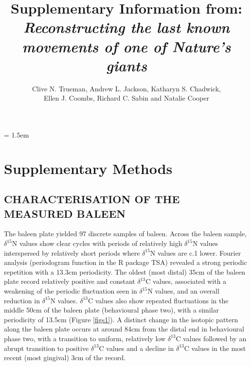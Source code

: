 \documentclass[a4paper,12pt]{article}
\title{Supplementary Information from:\\
\textit{Reconstructing the last known movements of one of Nature's giants}}
\author{Clive N. Trueman, Andrew L. Jackson, Katharyn S. Chadwick,\\ 
Ellen J. Coombs, Richard C. Sabin and Natalie Cooper}
\date{}
\begin{document}

\maketitle

\parindent = 1.5em
\addtolength{\parskip}{.3em}


\section*{Supplementary Methods}
 
\subsection*{CHARACTERISATION OF THE MEASURED BALEEN}
The baleen plate yielded 97 discrete samples of baleen. 
Across the baleen sample, $\delta^{15}$N values show clear cycles with periods of relatively high $\delta^{15}$N values interspersed by relatively short periods where $\delta^{15}$N values are c.1\text{\textperthousand} lower. 
Fourier analysis (periodogram function in the R package TSA\cite{Chan:2012aa}) revealed a strong periodic repetition with a 13.3cm periodicity. 
The oldest (most distal) 35cm of the baleen plate  record relatively positive and constant $\delta^{13}$C values, associated with a weakening of the periodic fluctuation seen in $\delta^{15}$N values, and an overall reduction in $\delta^{15}$N values. 
$\delta^{13}$C values also show repeated fluctuations in the middle 50cm of the baleen plate (behavioural phase two), with a similar periodicity of 13.5cm (Figure \ref{figs1}). 
A distinct change in the isotopic pattern along the baleen plate occurs at around 84cm from the distal end in behavioural phase two, with a transition to uniform, relatively low $\delta^{13}$C values followed by an abrupt transition to positive $\delta^{13}$C values and a decline in $\delta^{13}$C values in the most recent (most gingival) 3cm of the record.
\end{document}
